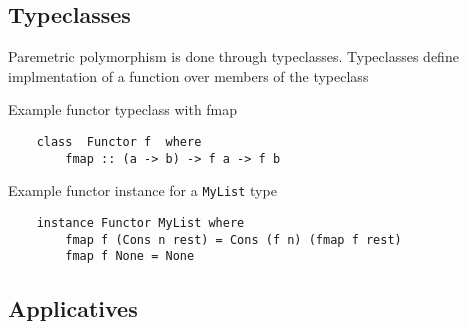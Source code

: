 \documentclass{article}
\begin{document}
\subsection{Typeclasses}
Paremetric polymorphism is done through typeclasses. Typeclasses define
implmentation of a function over members of the typeclass
\bigskip

Example functor typeclass with fmap
\begin{verbatim}
    class  Functor f  where
        fmap :: (a -> b) -> f a -> f b
\end{verbatim}

Example functor instance for a \verb|MyList| type
\begin{verbatim}
    instance Functor MyList where
        fmap f (Cons n rest) = Cons (f n) (fmap f rest)
        fmap f None = None
    \end{verbatim}
\FloatBarrier

\subsection{Applicatives}


\appendix
\end{document}
